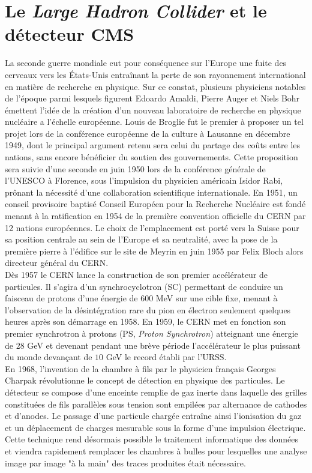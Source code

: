 \chapter{Le \textit{\uppercase{L}arge \uppercase{H}adron \uppercase{C}ollider} et le détecteur CMS}
\label{chap4}

La seconde guerre mondiale eut pour conséquence sur l'Europe une fuite des cerveaux vers les États-Unis entraînant la perte de son rayonnement international en matière de recherche en physique. Sur ce constat, plusieurs physiciens notables de l'époque parmi lesquels figurent Edoardo Amaldi, Pierre Auger et Niels Bohr émettent l'idée de la création d'un nouveau laboratoire de recherche en physique nucléaire a l'échelle européenne. Louis de Broglie fut le premier à proposer un tel projet lors de la conférence européenne de la culture à Lausanne en décembre 1949, dont le principal argument retenu sera celui du partage des coûts entre les nations, sans encore bénéficier du soutien des gouvernements. Cette proposition sera suivie d'une seconde en juin 1950 lors de la conférence générale de l'UNESCO à Florence, sous l'impulsion du physicien américain Isidor Rabi, prônant la nécessité d'une collaboration scientifique internationale. En 1951, un conseil provisoire baptisé Conseil Européen pour la Recherche Nucléaire est fondé menant à la ratification en 1954 de la première convention officielle du CERN par 12 nations européennes. Le choix de l'emplacement est porté vers la Suisse pour sa position centrale au sein de l'Europe et sa neutralité, avec la pose de la première pierre à l'édifice sur le site de Meyrin en juin 1955 par Felix Bloch alors directeur général du CERN. \\

Dès 1957 le CERN lance la construction de son premier accélérateur de particules. Il s'agira d'un synchrocyclotron (SC) permettant de conduire un faisceau de protons d'une énergie de $600$ MeV sur une cible fixe, menant à l'observation de la désintégration rare du pion en électron seulement quelques heures après son démarrage en 1958. En 1959, le CERN met en fonction son premier synchrotron à protons (PS, \textit{Proton Synchrotron}) atteignant une énergie de $28$ GeV et devenant pendant une brève période l'accélérateur le plus puissant du monde devançant de $10$ GeV le record  établi par l'URSS. \\

En 1968, l'invention de la chambre à fils par le physicien français Georges Charpak révolutionne le concept de détection en physique des particules. Le détecteur se compose d'une enceinte remplie de gaz inerte dans laquelle des grilles constituées de fils parallèles sous tension sont empilées par alternance de cathodes et d'anodes. Le passage d'une particule chargée entraîne ainsi l'ionisation du gaz et un déplacement de charges mesurable sous la forme d'une impulsion électrique. Cette technique rend désormais possible le traitement informatique des données et viendra rapidement remplacer les chambres à bulles pour lesquelles une analyse image par image "à la main" des traces produites était nécessaire. \\

